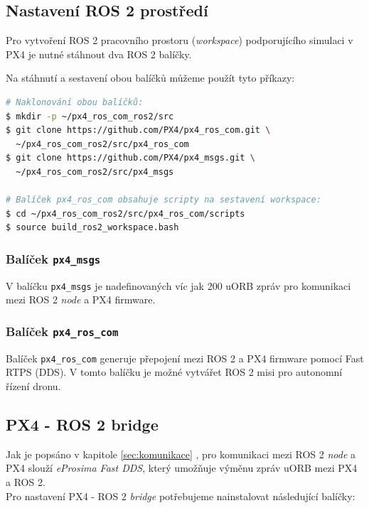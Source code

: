 \subsection{Nastavení ROS 2 prostředí}

Pro vytvoření ROS 2 pracovního prostoru (\textit{workspace}) podporujícího simulaci v PX4 je nutné stáhnout dva ROS 2 balíčky. \cite{ROS2BRIDGE}

Na stáhnutí a sestavení obou balíčků můžeme použít tyto příkazy:

\begin{lstlisting}[language=bash]
# Naklonování obou balíčků:
$ mkdir -p ~/px4_ros_com_ros2/src
$ git clone https://github.com/PX4/px4_ros_com.git \
  ~/px4_ros_com_ros2/src/px4_ros_com
$ git clone https://github.com/PX4/px4_msgs.git \
  ~/px4_ros_com_ros2/src/px4_msgs
  
# Balíček px4_ros_com obsahuje scripty na sestavení workspace:
$ cd ~/px4_ros_com_ros2/src/px4_ros_com/scripts
$ source build_ros2_workspace.bash
\end{lstlisting}

\subsubsection{Balíček \texttt{px4\_msgs}}

V balíčku \texttt{px4\_msgs} je nadefinovaných víc jak 200 uORB zpráv pro komunikaci mezi ROS 2 \textit{node} a PX4 firmware.

\subsubsection{Balíček \texttt{px4\_ros\_com}}

Balíček \texttt{px4\_ros\_com} generuje přepojení mezi ROS 2 a PX4 firmware pomocí Fast RTPS (\acs{DDS}). V tomto balíčku je možné vytvářet ROS 2 misi pro autonomní řízení dronu.

\subsection{PX4 - ROS 2 bridge}

Jak je popsáno v kapitole \ref{sec:komunikace} , pro komunikaci mezi ROS 2 \textit{node} a PX4 slouží \textit{eProsima Fast DDS}, který umožňuje výměnu zpráv uORB mezi PX4 a ROS 2.\\

Pro nastavení PX4 - ROS 2 \textit{bridge} potřebujeme nainstalovat následující balíčky:

